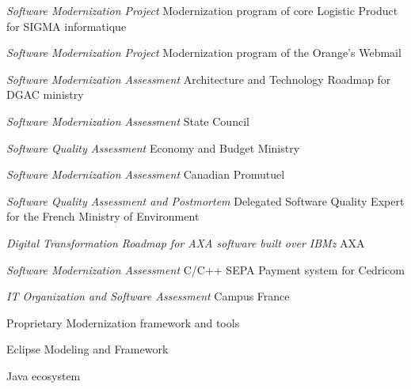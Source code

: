 \begin{cventries}
{{\begin{cvitems}
            \item{\emph{Software Modernization Project} Modernization program of core Logistic Product for SIGMA informatique}
            \item{\emph{Software Modernization Project} Modernization program of the Orange's Webmail}
            \item{\emph{Software Modernization Assessment} Architecture and Technology Roadmap for DGAC ministry}
            \item{\emph{Software Modernization Assessment} State Council}
            \item{\emph{Software Quality Assessment} Economy and Budget Ministry}
            \item{\emph{Software Modernization Assessment} Canadian Promutuel}
            \item{\emph{Software Quality Assessment and Postmortem} Delegated Software Quality Expert for the French Ministry of Environment}
            \item{\emph{Digital Transformation Roadmap for AXA software built over IBMz} AXA}
            \item{\emph{Software Modernization Assessment} C/C++ SEPA Payment system for Cedricom}
            \item{\emph{IT Organization and Software Assessment} Campus France}
           \end{cvitems}
        }
        {
            \begin{cvitems} %
                \item{Proprietary Modernization framework and tools}
                \item{Eclipse Modeling and Framework}
                \item{Java ecosystem}
            \end{cvitems}
        }
    }




\end{cventries}
